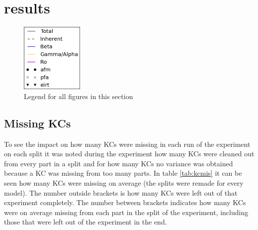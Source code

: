 \documentclass{scrartcl}
\newcommand\todo[1]{\textit{\textcolor{red}{#1}}}
\begin{document}

\section{results}

\begin{figure}
\includegraphics[width=30mm]{images/legend.png}
\caption{Legend for all figures in this section}
\label{fig:legend}
\end{figure}

\subsection{Missing KCs}
To see the impact on how many KCs were missing in each run of the experiment on each split it was noted during the experiment how many KCs were cleaned out from every part in a split and for how many KCs no variance was obtained because a KC was missing from too many parts. In table \ref{tab:kcmis} it can be seen how many KCs were missing on average (the splits were remade for every model). The number outside brackets is how many KCs were left out of that experiment completely. The number between brackets indicates how many KCs were on average missing from each part in the split of the experiment, including those that were left out of the experiment in the end. 
\end{document}
